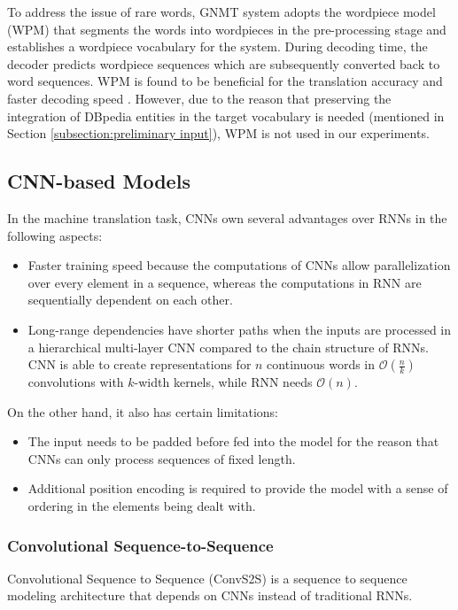 To address the issue of rare words, GNMT system adopts the wordpiece model (WPM) that segments the words into wordpieces in the pre-processing stage and establishes a wordpiece vocabulary for the system. During decoding time, the decoder predicts wordpiece sequences which are subsequently converted back to word sequences. WPM is found to be beneficial for the translation accuracy and faster decoding speed \cite{Wu2016}. However, due to the reason that preserving the integration of DBpedia entities in the target vocabulary is needed (mentioned in Section \ref{subsection:preliminary input}), WPM is not used in our experiments. 

\subsection{CNN-based Models} \label{subsection:cnn-based models}

In the machine translation task, CNNs own several advantages over RNNs in the following aspects:
\begin{itemize}
\item Faster training speed because the computations of CNNs allow parallelization over every element in a sequence, whereas the computations in RNN are sequentially dependent on each other.
\item Long-range dependencies have shorter paths when the inputs are processed in a hierarchical multi-layer CNN compared to the chain structure of RNNs. CNN is able to create representations for $ n $ continuous words in $ \mathcal{O}(\frac{n}{k}) $ convolutions with $ k $-width kernels, while RNN needs $ \mathcal{O}(n) $.
\end{itemize}
On the other hand, it also has certain limitations:
\begin{itemize}
\item The input needs to be padded before fed into the model for the reason that CNNs can only process sequences of fixed length.
\item Additional position encoding is required to provide the model with a sense of ordering in the elements being dealt with.
\end{itemize}

\subsubsection*{Convolutional Sequence-to-Sequence}

Convolutional Sequence to Sequence (ConvS2S) \cite{gehring2017convs2s} is a sequence to sequence modeling architecture that depends on CNNs instead of traditional RNNs. 

